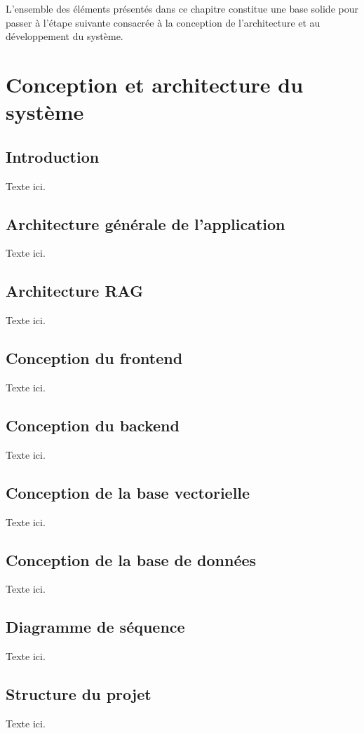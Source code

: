 \documentclass[12pt,a4paper]{report}
\begin{document}
L’ensemble des éléments présentés dans ce chapitre constitue une base solide pour passer à l’étape suivante consacrée à la conception de l’architecture et au développement du système.



\chapter{Conception et architecture du système}

\section{Introduction}
Texte ici.

\section{Architecture générale de l'application}
Texte ici.

\section{Architecture RAG}
Texte ici.

\section{Conception du frontend}
Texte ici.

\section{Conception du backend}
Texte ici.

\section{Conception de la base vectorielle}
Texte ici.

\section{Conception de la base de données}
Texte ici.

\section{Diagramme de séquence}
Texte ici.

\section{Structure du projet}
Texte ici.
\end{document}
